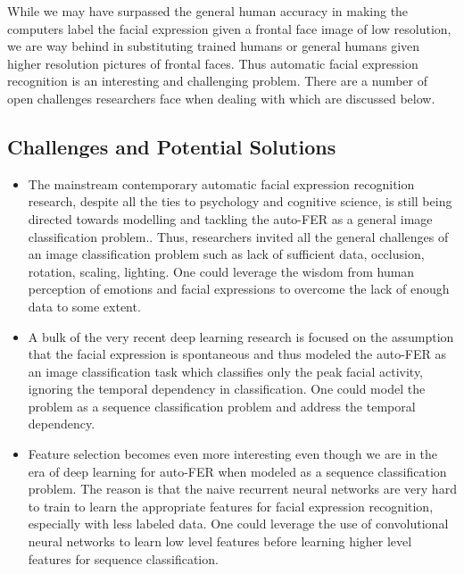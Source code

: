 While we may have surpassed the general human accuracy in making the computers label the facial expression given a frontal face image of low resolution\cite{SArt}, we are way behind in substituting trained humans or general humans given higher resolution pictures of frontal faces\cite{survey1,book1,ekmanwebsite}. Thus automatic facial expression recognition is an interesting and challenging problem. There are a number of open challenges researchers face when dealing with  which are discussed below.

\subsection{Challenges and Potential Solutions}
\begin{itemize}

\item The mainstream contemporary automatic facial expression recognition research, despite all the ties to psychology and cognitive science, is still being directed towards modelling and tackling the auto-FER as a general image classification problem.\cite{survey1}. Thus, researchers invited all the general challenges of an image classification problem such as lack of sufficient data, occlusion, rotation, scaling, lighting. One could leverage the wisdom from human perception of emotions and facial expressions to overcome the lack of enough data to some extent.

\item A bulk of the very recent deep learning research\cite{SArt} is focused on the assumption that the facial expression is spontaneous and thus modeled the auto-FER as an image classification task which classifies only the peak facial activity, ignoring the temporal dependency in classification. One could model the problem as a sequence classification problem and address the temporal dependency.

\item Feature selection becomes even more interesting even though we are in the era of deep learning for auto-FER when modeled as a sequence classification problem. The reason is that the naive recurrent neural networks are very hard to train to learn the appropriate features for facial expression recognition, especially with less labeled data. One could leverage the use of convolutional neural networks\cite{SArt} to learn low level features before learning higher level features for sequence classification.
\end{itemize}


